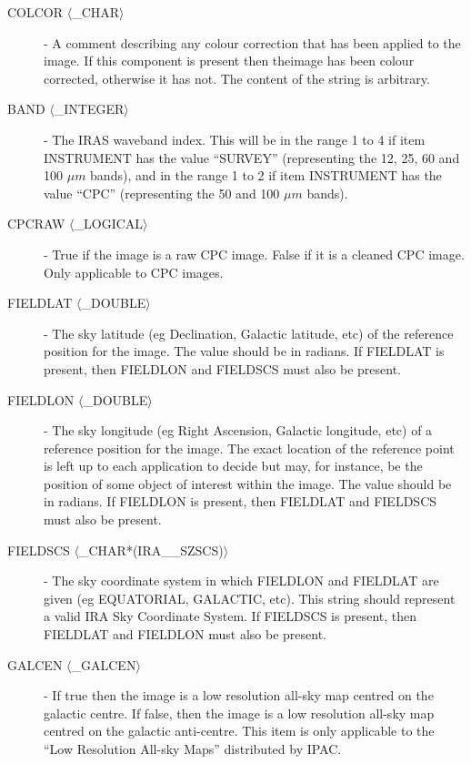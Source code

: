 \begin{description}

\item [COLCOR $\langle$\_CHAR$\rangle$] - A comment describing any colour
correction that has been applied to the image. If this component is present then
theimage has been colour corrected, otherwise it has not. The content of the
string is arbitrary.

\item [BAND $\langle$\_INTEGER$\rangle$] - The IRAS waveband index. This will be in the range 1
to 4 if item INSTRUMENT has the value ``SURVEY'' (representing the 12, 25, 60
and 100 $\mu m$ bands), and in the range 1 to 2 if item INSTRUMENT has the value
``CPC'' (representing the 50 and 100 $\mu m$ bands).

\item [CPCRAW $\langle$\_LOGICAL$\rangle$] - True if the image is a raw CPC image. False if it
is a cleaned CPC image. Only applicable to CPC images.

\item [FIELDLAT $\langle$\_DOUBLE$\rangle$] - The sky latitude (eg Declination, Galactic
latitude, etc) of the reference position for the image. The value should be in
radians. If FIELDLAT is present, then FIELDLON and FIELDSCS must also be
present.

\item [FIELDLON $\langle$\_DOUBLE$\rangle$] - The sky longitude (eg Right Ascension, Galactic
longitude, etc) of a reference position for the image. The exact location of the
reference point is left up to each application to decide but may, for instance,
be the position of some object of interest within the image. The value should be
in radians. If FIELDLON is present, then FIELDLAT and FIELDSCS must also be
present.

\item [FIELDSCS $\langle$\_CHAR*(IRA\_\_SZSCS)$\rangle$] - The sky coordinate system in which
FIELDLON and FIELDLAT are given (eg EQUATORIAL, GALACTIC, etc). This string
should represent a valid IRA Sky Coordinate System. If FIELDSCS is present, then
FIELDLAT and FIELDLON must also be present.

\item [GALCEN $\langle$\_GALCEN$\rangle$] - If true then the image is a low resolution all-sky
map centred on the galactic centre. If false, then the image is a low resolution
all-sky map centred on the galactic anti-centre. This item is only applicable to
the ``Low Resolution All-sky Maps'' distributed by IPAC.


\end{description}
